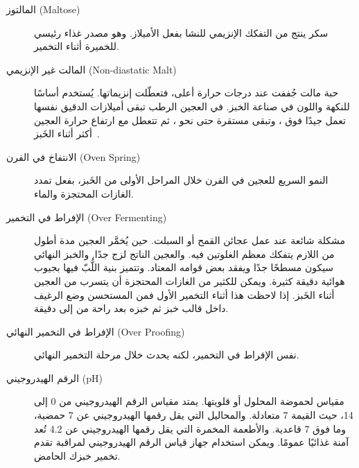 \begin{description}
\item[المالتوز \textenglish{(Maltose)}]
سكر ينتج من التفكك الإنزيمي للنشا بفعل الأميلاز. وهو مصدر غذاء رئيسي للخميرة أثناء التخمير.

\item[المالت غير الإنزيمي \textenglish{(Non-diastatic Malt)}]
حبة مالت جُففت عند درجات حرارة أعلى، فتعطّلت إنزيماتها. يُستخدم أساسًا للنكهة واللون في صناعة الخبز. في العجين الرطب تبقى أميلازات الدقيق نفسها تعمل جيدًا فوق ، وتبقى مستقرة حتى نحو ، ثم تتعطل مع ارتفاع حرارة العجين أكثر أثناء الخَبز~\cite{wheat+amylase+singh,innograin+enzymes,reichenberger+amylase}.

\item[الانتفاخ في الفرن \textenglish{(Oven Spring)}]
النمو السريع للعجين في الفرن خلال المراحل الأولى من الخَبز، بفعل تمدد الغازات المحتجزة والماء.

\item[الإفراط في التخمير \textenglish{(Over Fermenting)}]
مشكلة شائعة عند عمل عجائن القمح أو السبلت. حين يُخمَّر العجين مدة أطول من اللازم يتفكك معظم الغلوتين فيه. والعجين الناتج لزج جدًا. والخبز النهائي سيكون مسطحًا جدًا ويفقد بعض قوامه المعتاد. وتتميز بنية اللُّبّ فيها بجيوب هوائية دقيقة كثيرة. ويمكن للكثير من الغازات المحتجزة أن يتسرب من العجين أثناء الخَبز. إذا لاحظت هذا أثناء التخمير الأول فمن المستحسن وضع الرغيف داخل قالب خبز ثم خبزه بعد راحة من  إلى  دقيقة.

\item[الإفراط في التخمير النهائي \textenglish{(Over Proofing)}]
نفس الإفراط في التخمير، لكنه يحدث خلال مرحلة التخمير النهائي.

\item[الرقم الهيدروجيني \textenglish{(pH)}]
مقياس لحموضة المحلول أو قلويتها. يمتد مقياس الرقم الهيدروجيني من 0 إلى 14، حيث القيمة 7 متعادلة. والمحاليل التي يقل رقمها الهيدروجيني عن 7 حمضية، وما فوق 7 قاعدية. والأطعمة المخمرة التي يقل رقمها الهيدروجيني عن 4.2 تُعد آمنة غذائيًا عمومًا. ويمكن استخدام جهاز قياس الرقم الهيدروجيني لمراقبة تقدم تخمير خبزك الحامض.


\end{description}
